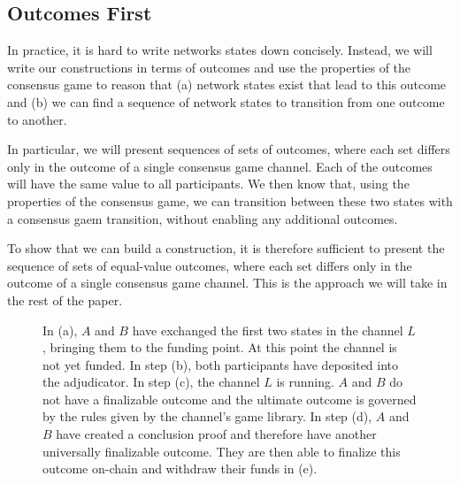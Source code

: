 \subsection{Outcomes First}

In practice, it is hard to write networks states down concisely.
Instead, we will write our constructions in terms of outcomes and use the properties of the consensus game to reason that (a) network states exist that lead to this outcome and (b) we can find a sequence of network states to transition from one outcome to another.

In particular, we will present sequences of sets of outcomes, where each set differs only in the outcome of a single consensus game channel.
Each of the outcomes will have the same value to all participants.
We then know that, using the properties of the consensus game, we can transition between these two states with a consensus gaem transition, without enabling any additional outcomes.

To show that we can build a construction, it is therefore sufficient to present the sequence of sets of equal-value outcomes, where each set differs only in the outcome of a single consensus game channel. This is the approach we will take in the rest of the paper.

\begin{figure}[h]\centering
  \makebox[\textwidth][c]{}
  \caption{
    In (a), $A$ and $B$ have exchanged the first two states in the channel $L$, bringing them to the funding point. At this point the channel is not yet funded.
    In step (b), both participants have deposited into the adjudicator.
    In step (c), the channel $L$ is running.
    $A$ and $B$ do not have a finalizable outcome and the ultimate outcome is governed by the rules given by the channel's game library.
    In step (d), $A$ and $B$ have created a conclusion proof and therefore have another universally finalizable outcome.
    They are then able to finalize this outcome on-chain and withdraw their funds in (e).
  }
\end{figure}
